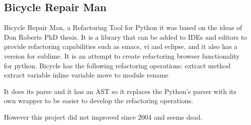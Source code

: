 
\subsection{Bicycle Repair Man}

Bicycle Repair Man, a Refactoring Tool for Python it was based on the ideas of Don Roberts PhD thesis. It is a library that can be added to IDEs and editors to provide refactoring capabilities such as emacs, vi and eclipse, and it also has a version for sublime.
It is an attempt to create refactoring browser functionality for python. 
Bicycle has the following refactoring operations:
extract method
extract variable
inline variable
move to module
rename

It does its parse and it has an AST so it replaces the Python's parser with its own wrapper to be easier to develop the refactoring operations.

However this project did not improved since 2004 and seems dead.

